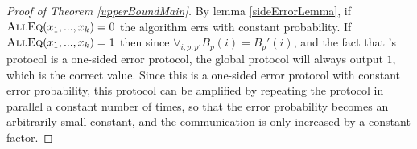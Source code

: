 	\begin{proof}[Proof of Theorem \ref{upperBoundMain}]
		By lemma \ref{sideErrorLemma}, if $\text{\textsc{AllEq}}(x_1,...,x_k)=0$ the algorithm errs with constant probability. If $\text{\textsc{AllEq}}(x_1,...,x_k)=1$ then since $\forall_{i,p,p'} B_p(i) = B_p'(i)$, and the fact that \cite{BK97}'s protocol is a one-sided error protocol, the global protocol will always output $1$, which is the correct value. Since this is a one-sided error protocol with constant error probability, this protocol can be amplified by repeating the protocol in parallel a constant number of times, so that the error probability becomes an arbitrarily small constant, and the communication is only increased by a constant factor.
	\end{proof}

